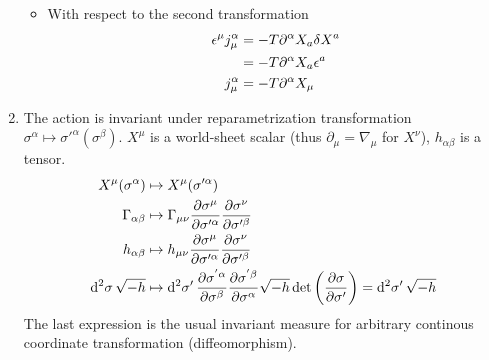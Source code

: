 \begin{enumerate}[label=(\alph*)]
\begin{itemize}
			\item With respect to the second transformation
				\begin{align}
					\epsilon^\mu j^\alpha_\mu &= -T \partial^\alpha X_a \delta X^a \notag \\
													  &= -T \partial^\alpha X_a \epsilon^a  \notag \\
													 j^\alpha_\mu &= -T \partial^\alpha X_\mu
				\end{align}
		\end{itemize}
	\item The action is invariant under reparametrization transformation $\sigma^\alpha \mapsto \sigma'^\alpha (\sigma^\beta)$. $X^\mu$ is a world-sheet scalar (thus $\partial_\mu = \nabla_\mu$ for $X^\nu$), $h_{\alpha\beta}$ is a tensor.
		\begin{align*}
			X^\mu (\sigma^\alpha) &\mapsto X^\mu(\sigma'^\alpha) \\
			\Gamma_{\alpha\beta} &\mapsto \Gamma_{\mu\nu} \pdv{\sigma^\mu}{\sigma'^\alpha} \pdv{\sigma^\nu}{\sigma'^\beta}  \\
			h_{\alpha \beta} &\mapsto h_{\mu\nu} \pdv{\sigma^\mu}{\sigma'^\alpha} \pdv{\sigma^\nu}{\sigma'^\beta} \\
			\dd[2]{\sigma}\sqrt{-h} &\mapsto \dd[2]{\sigma'} \pdv{\sigma^{'\alpha}}{\sigma^\beta} \pdv{\sigma^{' \beta}}{\sigma^\alpha}  \sqrt{- h}  \det \left(\pdv{\sigma}{\sigma'} \right) = \dd[2]{\sigma'} \sqrt{-h}
		\end{align*}
		The last expression is the usual invariant measure for arbitrary continous coordinate transformation (diffeomorphism).


\end{enumerate}
